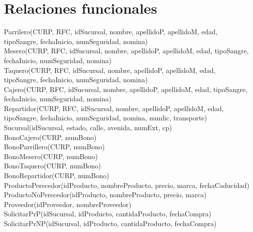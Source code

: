\documentclass[a4paper, 12pt]{report}
\begin{document}
\section*{Relaciones funcionales}
Parrilero(CURP, RFC, idSucursal, nombre, apellidoP, apellidoM, edad,
    tipoSangre, fechaInicio, numSeguridad, nomina)\\

Mesero(CURP, RFC, idSucursal, nombre, apellidoP, apellidoM, edad,
    tipoSangre, fechaInicio, numSeguridad, nomina)\\

Taquero(CURP, RFC, idSucursal, nombre, apellidoP, apellidoM, edad,
    tipoSangre, fechaInicio, numSeguridad, nomina)\\

Cajero(CURP, RFC, idSucursal, nombre, apellidoP, apellidoM, edad,
    tipoSangre, fechaInicio, numSeguridad, nomina)\\

Repartidor(CURP, RFC, idSucursal, nombre, apellidoP, apellidoM, edad,
    tipoSangre, fechaInicio, numSeguridad, nomina, numlic, transporte)\\

Sucursal(idSucursal, estado, calle, avenida, numExt, cp)\\

BonoCajero(CURP, numBono)\\

BonoParrillero(CURP, numBono)\\

BonoMesero(CURP, numBono)\\

BonoTaquero(CURP, numBono)\\

BonoRepartidor(CURP, numBono)\\

ProductoPerecedor(idProducto, nombreProducto, precio, marca, fechaCaducidad)\\

ProductoNoPerecedor(idProducto, nombreProducto, precio, marca)\\

Proveedor(idProveedor, nombreProveedor)\\

SolicitarPrP(idSucursal, idProducto, cantidaProducto, fechaCompra)\\

SolicitarPrNP(idSucursal, idProducto, cantidaProducto, fechaCompra)\\
\end{document}
